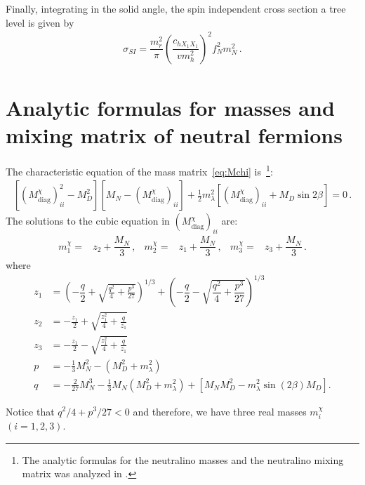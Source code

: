 Finally, integrating in the solid angle, the spin independent cross section a tree level is given by
\begin{align}
\label{eq:SI-tree-level}
\sigma_{SI}=\dfrac{m_r^2}{\pi}\left(\dfrac{c_{hX_1X_1}}{vm_h^2}\right)^2f_N^2m_N^2\,.
\end{align}
% 





\section{Analytic formulas for masses and mixing matrix of neutral fermions}
\label{sec:analyt-form-mass}

The characteristic equation of the mass matrix~\eqref{eq:Mchi}
is~\cite{Cheung:2013dua}\footnote{The analytic formulas for the neutralino
  masses and the neutralino mixing matrix was
  analyzed in \cite{ElKheishen:1992yv}.}:
\begin{align}
\left[\left({M}^{\chi}_{\text{diag}}\right)_{ii}^2-M_D^2\right]
\left[M_N-\left({M}^{\chi}_{\text{diag}}\right)_{ii}^{\phantom{2}}
\right]
+\tfrac{1}{2}m_{\lambda}^2\left[\left({M}^{\chi}_{\text{diag}}\right)_{ii}+M_D\sin 2\beta
\right]=0\,.
\label{eq:characteristic-equation}
\end{align}
The solutions to the cubic equation in  $\left({M}^{\chi}_{\text{diag}}\right)_{ii}$ are:
\begin{align}
m_1^\chi=&z_2+\dfrac{M_N}{3}\,,&
m_2^\chi=&z_1+\dfrac{M_N}{3}\,, &
m_3^\chi=&z_3+\dfrac{M_N}{3}\,.
\end{align}
where
\begin{align}
z_1&=\left(-\dfrac{q}{2}+\sqrt{\frac{q^2}{4}+\frac{p^3}{27}}\right)^{1/3} + \left(-\dfrac{q}{2}-\sqrt{\dfrac{q^2}{4}+\dfrac{p^3}{27}}\right)^{1/3}\nonumber\\ 
z_2&=-\frac{z_1}{2}+\sqrt{\frac{z_1^2}{4}+\frac{q}{z_1}} \nonumber\\ 
z_3&=-\frac{z_1}{2}-\sqrt{\frac{z_1^2}{4}+\frac{q}{z_1}}\nonumber\\ 
p&=-\frac{1}{3}M_N^2-\left(M_D^2+m_{\lambda}^2\right)  \nonumber\\ 
q&=-\frac{2}{27}M_N^3-\frac{1}{3}M_N\left(M_D^2+m_{\lambda}^2\right)+\left[M_NM_D^2-m_{\lambda}^2\sin(2\beta) M_D\right].
\end{align}

Notice that ${q^2}/{4}+{p^3}/{27} < 0$ and therefore, we have three real masses $m_i^\chi$ $(i=1,2,3)$.

